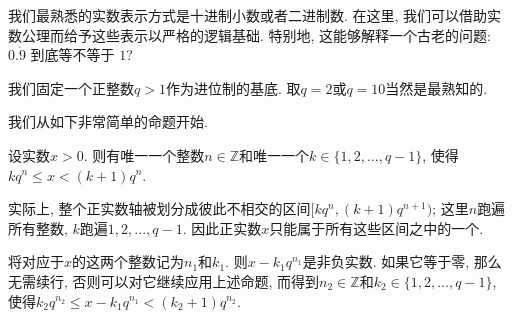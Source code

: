 

我们最熟悉的实数表示方式是十进制小数或者二进制数. 在这里, 我们可以借助实数公理而给予这些表示以严格的逻辑基础. 特别地, 这能够解释一个古老的问题: $0.\dot{9}$ 到底等不等于 $1$?

我们固定一个正整数$q>1$作为进位制的基底. 取$q=2$或$q=10$当然是最熟知的.

我们从如下非常简单的命题开始. 
\begin{lemma}{}
设实数$x>0$. 则有唯一一个整数$n\in\mathbb{Z}$和唯一一个$k\in\{1,2,...,q-1\}$, 使得$kq^n\leq x<(k+1)q^{n}$.
\end{lemma}

实际上, 整个正实数轴被划分成彼此不相交的区间$[kq^n,(k+1)q^{n+1})$; 这里$n$跑遍所有整数, $k$跑遍$1,2,...,q-1$. 因此正实数$x$只能属于所有这些区间之中的一个. 

将对应于$x$的这两个整数记为$n_1$和$k_1$. 则$x-k_1q^{n_1}$是非负实数. 如果它等于零, 那么无需续行, 否则可以对它继续应用上述命题, 而得到$n_2\in\mathbb{Z}$和$k_2\in\{1,2,...,q-1\}$, 使得$k_2q^{n_2}\leq x-k_1q^{n_1}<(k_2+1)q^{n_2}$.